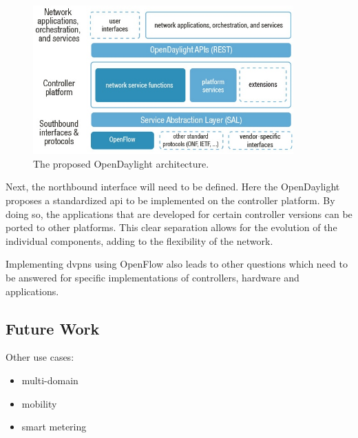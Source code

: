 \begin{figure}[!h]
	\centering
	\includegraphics[width=10cm]{./includes/opendaylight.jpg}
	\caption{The proposed OpenDaylight architecture.}
	\label{fig:opendaylight}
\end{figure}

Next, the northbound interface will need to be defined. Here the OpenDaylight proposes a standardized \ac{api} to be implemented on the controller platform. By doing so, the applications that are developed for certain controller versions can be ported to other platforms. This clear separation allows for the evolution of the individual components, adding to the flexibility of the network.

Implementing \acp{dvpn} using OpenFlow also leads to other questions which need to be answered for specific implementations of controllers, hardware and applications. 


\subsection{Future Work} %
\label{sub:future_work}


Other use cases:
\begin{itemize}
	\item multi-domain
	\item mobility
	\item smart metering
\end{itemize}

